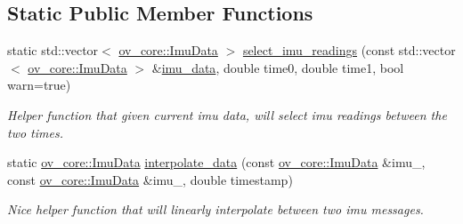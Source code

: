 \subsection*{Static Public Member Functions}
\begin{DoxyCompactItemize}
\item 
static std\+::vector$<$ \hyperlink{structov__core_1_1ImuData}{ov\+\_\+core\+::\+Imu\+Data} $>$ \hyperlink{classov__msckf_1_1Propagator_a2f2d18be72bfc40bab5ae5eab2bae10e}{select\+\_\+imu\+\_\+readings} (const std\+::vector$<$ \hyperlink{structov__core_1_1ImuData}{ov\+\_\+core\+::\+Imu\+Data} $>$ \&\hyperlink{classov__msckf_1_1Propagator_aa1639a14dc1149d2e47be177bf33b572}{imu\+\_\+data}, double time0, double time1, bool warn=true)
\begin{DoxyCompactList}\small\item\em Helper function that given current imu data, will select imu readings between the two times. \end{DoxyCompactList}\item 
static \hyperlink{structov__core_1_1ImuData}{ov\+\_\+core\+::\+Imu\+Data} \hyperlink{classov__msckf_1_1Propagator_a3dde6d888eec85594aa6a864d141d5dc}{interpolate\+\_\+data} (const \hyperlink{structov__core_1_1ImuData}{ov\+\_\+core\+::\+Imu\+Data} \&imu\+\_, const \hyperlink{structov__core_1_1ImuData}{ov\+\_\+core\+::\+Imu\+Data} \&imu\+\_, double timestamp)
\begin{DoxyCompactList}\small\item\em Nice helper function that will linearly interpolate between two imu messages. \end{DoxyCompactList}\end{DoxyCompactItemize}
